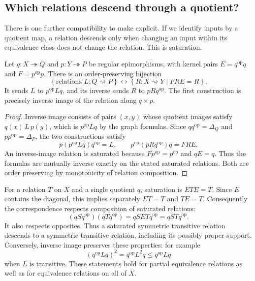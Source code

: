 \subsection{Which relations descend through a quotient?}

There is one further compatibility to make explicit. If we identify
inputs by a quotient map, a relation descends only when changing an
input within its equivalence class does not change the relation. This
is saturation.

\begin{proposition}\label{d:saturated-descent}
Let $q:X\twoheadrightarrow Q$ and $p:Y\twoheadrightarrow P$ be
regular epimorphisms, with kernel pairs
$E=q^{\mathrm{op}}q$ and $F=p^{\mathrm{op}}p$. There is an
order-preserving bijection
\[
\left\{\text{relations }L:Q\rightsquigarrow P\right\}
\longleftrightarrow
\left\{R:X\rightsquigarrow Y\mid FRE=R\right\}.
\]
It sends $L$ to $p^{\mathrm{op}}Lq$, and its inverse sends $R$ to
$pRq^{\mathrm{op}}$. The first construction is precisely inverse image
of the relation along $q\times p$.
\end{proposition}
\begin{proof}
Inverse image consists of pairs $(x,y)$ whose quotient images satisfy
$q(x)\,L\,p(y)$, which is $p^{\mathrm{op}}Lq$ by the graph formulas.
Since $qq^{\mathrm{op}}=\Delta_Q$ and
$pp^{\mathrm{op}}=\Delta_P$, the two constructions satisfy
\[
p(p^{\mathrm{op}}Lq)q^{\mathrm{op}}=L,
\qquad
p^{\mathrm{op}}(pRq^{\mathrm{op}})q=FRE.
\]
An inverse-image relation is saturated because
$Fp^{\mathrm{op}}=p^{\mathrm{op}}$ and $qE=q$. Thus the formulas are
mutually inverse exactly on the stated saturated relations. Both are
order preserving by monotonicity of relation composition.
\end{proof}

For a relation $T$ on $X$ and a single quotient $q$, saturation is
$ETE=T$. Since $E$ contains the diagonal, this implies separately
$ET=T$ and $TE=T$. Consequently the correspondence respects
composition of saturated relations:
\[
(qSq^{\mathrm{op}})(qTq^{\mathrm{op}})
=qSETq^{\mathrm{op}}=qSTq^{\mathrm{op}}.
\]
It also respects opposites. Thus a saturated symmetric transitive
relation descends to a symmetric transitive relation, including its
possibly proper support. Conversely, inverse image preserves these
properties: for example
\[
(q^{\mathrm{op}}Lq)^2
=q^{\mathrm{op}}L^2q\leq q^{\mathrm{op}}Lq
\]
when $L$ is transitive. These statements hold for partial equivalence
relations as well as for equivalence relations on all of $X$.

